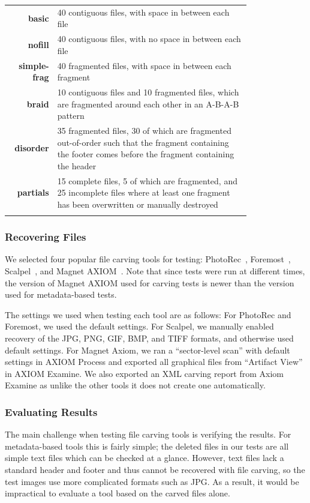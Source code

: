 \begin{table}[ht!]
{\begin{tabular*}{\textwidth}{@{}rp{0.8\linewidth}@{}} \toprule
\textbf{basic} & 40 contiguous files, with space in between each file \\
\textbf{nofill} & 40 contiguous files, with no space in between each file \\
\textbf{simple-frag} & 40 fragmented files, with space in between each fragment \\
\textbf{braid} & 10 contiguous files and 10 fragmented files, which are fragmented around each other in an A-B-A-B pattern \\
\textbf{disorder} & 35 fragmented files, 30 of which are fragmented out-of-order such that the fragment containing the footer comes before the fragment containing the header \\
\textbf{partials} & 15 complete files, 5 of which are fragmented, and 25 incomplete files where at least one fragment has been overwritten or manually destroyed \\
\botrule
\end{tabular*}}
\label{carve_cases}
\end{table}


\subsubsection{Recovering Files}

We selected four popular file carving tools for testing: PhotoRec~\cite{photorec}, Foremost~\cite{foremost}, Scalpel~\cite{scalpel}, and Magnet AXIOM~\cite{axiom_carve}.
Note that since tests were run at different times, the version of Magnet AXIOM used for carving tests is newer than the version used for metadata-based tests.

The settings we used when testing each tool are as follows:
For PhotoRec and Foremost, we used the default settings.
For Scalpel, we manually enabled recovery of the JPG, PNG, GIF, BMP, and TIFF formats, and otherwise used default settings.
For Magnet Axiom, we ran a ``sector-level scan'' with default settings in AXIOM Process and exported all graphical files from ``Artifact View'' in AXIOM Examine.
We also exported an XML carving report from Axiom Examine as unlike the other tools it does not create one automatically.

\subsubsection{Evaluating Results}
The main challenge when testing file carving tools is verifying the results. 
For metadata-based tools this is fairly simple; the deleted files in our tests are all simple text files which can be checked at a glance.
However, text files lack a standard header and footer and thus cannot be recovered with file carving, so the test images use more complicated formats such as JPG.
As a result, it would be impractical to evaluate a tool based on the carved files alone.

